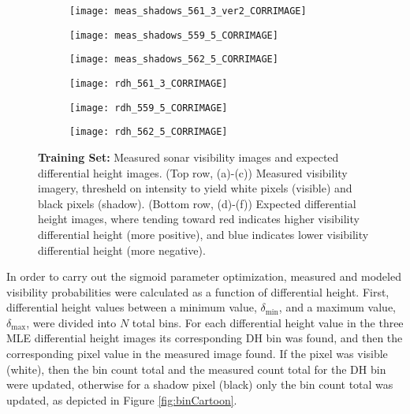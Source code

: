 \begin{figure}[!h]
	\centering
	\begin{subfigure}[b]{0.365\textwidth}
		\texttt{[image: meas\_shadows\_561\_3\_ver2\_CORRIMAGE]}
		\caption{}
	\end{subfigure}
	\centering
	\begin{subfigure}[b]{0.224\textwidth}
		\texttt{[image: meas\_shadows\_559\_5\_CORRIMAGE]}
		\caption{}
	\end{subfigure}
	\centering
	\begin{subfigure}[b]{0.365\textwidth}
		\texttt{[image: meas\_shadows\_562\_5\_CORRIMAGE]}
		\caption{}
	\end{subfigure}
	
	\centering
	\begin{subfigure}[b]{0.365\textwidth}
		\texttt{[image: rdh\_561\_3\_CORRIMAGE]}
		\caption{}
	\end{subfigure}
	\centering
	\begin{subfigure}[b]{0.224\textwidth}
		\texttt{[image: rdh\_559\_5\_CORRIMAGE]}
		\caption{}
	\end{subfigure}
	\centering
	\begin{subfigure}[b]{0.365\textwidth}
		\texttt{[image: rdh\_562\_5\_CORRIMAGE]}
		\caption{}
	\end{subfigure}
	
	\caption{\textbf{Training Set:} Measured sonar visibility images and expected differential height images.  (Top row, (a)-(c)) Measured visibility imagery, thresheld on intensity to yield white pixels (visible) and black pixels (shadow). (Bottom row, (d)-(f)) Expected differential height images, where tending toward red indicates higher visibility differential height (more positive), and blue indicates lower visibility differential height (more negative).}
	\label{fig:dhTrainingSet}
\end{figure}

In order to carry out the sigmoid parameter optimization, measured and modeled visibility probabilities were calculated as a function of differential height.  First, differential height values between a minimum value, $\delta_{\text{min}}$, and a maximum value, $\delta_{\text{max}}$, were divided into $N$ total bins. For each differential height value in the three MLE differential height images its corresponding DH bin was found, and then the corresponding pixel value in the measured image found.  If the pixel was visible (white), then the bin count total and the measured count total for the DH bin were updated, otherwise for a shadow pixel (black) only the bin count total was updated, as depicted in Figure \ref{fig:binCartoon}.

